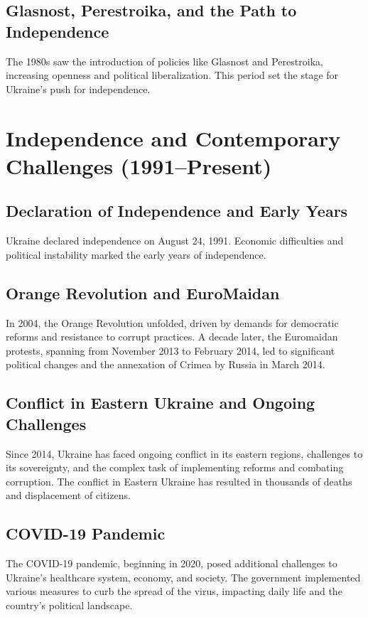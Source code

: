 \documentclass[a4paper,12pt]{book}
\begin{document}
\subsection{Glasnost, Perestroika, and the Path to Independence}
The 1980s saw the introduction of policies like Glasnost and Perestroika, increasing openness and political liberalization. This period set the stage for Ukraine's push for independence.

\section{Independence and Contemporary Challenges (1991–Present)}
\label{sec:independence-contemporary-challenges}
\subsection{Declaration of Independence and Early Years}
Ukraine declared independence on August 24, 1991. Economic difficulties and political instability marked the early years of independence.

\subsection{Orange Revolution and EuroMaidan}
In 2004, the Orange Revolution unfolded, driven by demands for democratic reforms and resistance to corrupt practices. A decade later, the Euromaidan protests, spanning from November 2013 to February 2014, led to significant political changes and the annexation of Crimea by Russia in March 2014.

\subsection{Conflict in Eastern Ukraine and Ongoing Challenges}
Since 2014, Ukraine has faced ongoing conflict in its eastern regions, challenges to its sovereignty, and the complex task of implementing reforms and combating corruption. The conflict in Eastern Ukraine has resulted in thousands of deaths and displacement of citizens.

\subsection{COVID-19 Pandemic}
The COVID-19 pandemic, beginning in 2020, posed additional challenges to Ukraine's healthcare system, economy, and society. The government implemented various measures to curb the spread of the virus, impacting daily life and the country’s political landscape.
\end{document}

